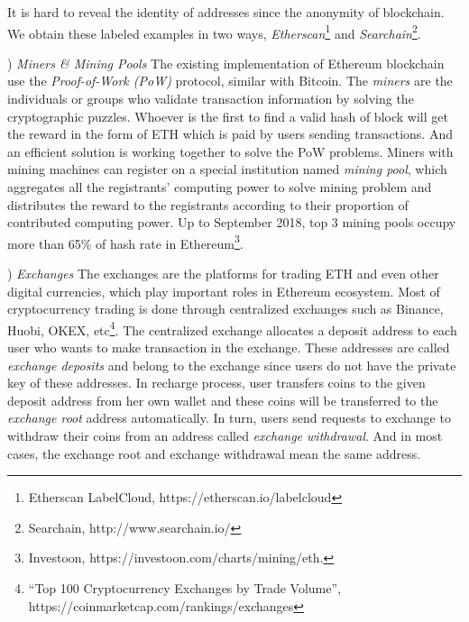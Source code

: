  It is hard to reveal the identity of addresses since the anonymity of blockchain. We obtain these labeled examples in two ways, \emph{Etherscan}\footnote{Etherscan LabelCloud, https://etherscan.io/labelcloud} and \emph{Searchain}\footnote{Searchain, http://www.searchain.io/}. %

) \emph{Miners \& Mining Pools}
The existing implementation of Ethereum blockchain use the \emph{Proof-of-Work (PoW)} protocol, similar with Bitcoin. 
The \emph{miners} are the individuals or groups who validate transaction information by solving the cryptographic puzzles. Whoever is the first to find a valid hash of block will get the reward in the form of ETH which is paid by users sending transactions. And an efficient solution is working together to solve the PoW problems. Miners with mining machines can register on a special institution named \emph{mining pool}, which aggregates all the registrants' computing power to solve mining problem and distributes the reward to the registrants according to their proportion of contributed computing power. Up to September 2018, top $3$ mining pools occupy more than 65\% of hash rate in Ethereum\footnote{Investoon, https://investoon.com/charts/mining/eth.}.



) \emph{Exchanges}
The exchanges are the platforms for trading ETH and even other digital currencies, which play important roles in Ethereum ecosystem. Most of cryptocurrency trading is done through centralized exchanges such as Binance, Huobi, OKEX, etc\footnote{``Top 100 Cryptocurrency Exchanges by Trade Volume'', https://coinmarketcap.com/rankings/exchanges}. The centralized exchange allocates a deposit address to each user who wants to make transaction in the exchange. These addresses are called \emph{exchange deposits} and belong to the exchange since users do not have the private key of these addresses. In recharge process, user transfers coins to the given deposit address from her own wallet and these coins will be transferred to the \emph{exchange root} address automatically. In turn, users send requests to exchange to withdraw their coins from an address called \emph{exchange withdrawal}. And in most cases, the exchange root and exchange withdrawal mean the same address.


